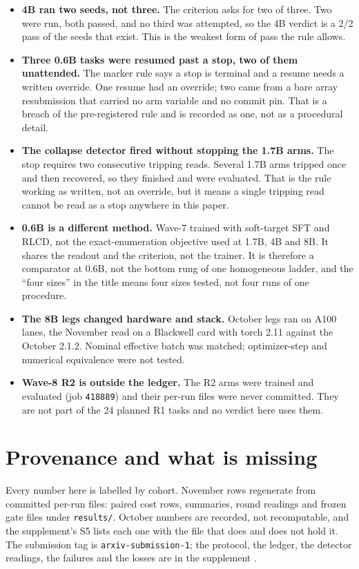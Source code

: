 \documentclass[11pt]{article}
\begin{document}
\begin{itemize}
  \item \textbf{4B ran two seeds, not three.} The criterion asks for two of three. Two were run, both
  passed, and no third was attempted, so the 4B verdict is a 2/2 pass of the seeds that exist. This is
  the weakest form of pass the rule allows.
  \item \textbf{Three 0.6B tasks were resumed past a stop, two of them unattended.} The marker rule says
  a stop is terminal and a resume needs a written override. One resume had an override; two came from a
  bare array resubmission that carried no arm variable and no commit pin. That is a breach of the
  pre-registered rule and is recorded as one, not as a procedural detail.
  \item \textbf{The collapse detector fired without stopping the 1.7B arms.} The stop requires two
  consecutive tripping reads. Several 1.7B arms tripped once and then recovered, so they finished and
  were evaluated. That is the rule working as written, not an override, but it means a single tripping
  read cannot be read as a stop anywhere in this paper.
  \item \textbf{0.6B is a different method.} Wave-7 trained with soft-target SFT and RLCD, not the
  exact-enumeration objective used at 1.7B, 4B and 8B. It shares the readout and the criterion, not the
  trainer. It is therefore a comparator at 0.6B, not the bottom rung of one homogeneous ladder, and the
  ``four sizes'' in the title means four sizes tested, not four runs of one procedure.
  \item \textbf{The 8B legs changed hardware and stack.} October legs ran on A100 lanes, the November
  read on a Blackwell card with torch 2.11 against the October 2.1.2. Nominal effective batch was
  matched; optimizer-step and numerical equivalence were not tested.
  \item \textbf{Wave-8 R2 is outside the ledger.} The R2 arms were trained and evaluated (job
  \texttt{418889}) and their per-run files were never committed. They are not part of the 24 planned
  R1 tasks and no verdict here uses them.
\end{itemize}

\section{Provenance and what is missing}\label{sec:prov}

Every number here is labelled by cohort. November rows regenerate from committed per-run files:
paired cost rows, summaries, round readings and frozen gate files under \texttt{results/}. October
numbers are recorded, not recomputable, and the supplement's S5 lists each one with the file that does
and does not hold it. The submission tag is \texttt{arxiv-submission-1}; the protocol, the ledger, the
detector readings, the failures and the losses are in the supplement \cite{supplement}.
\end{document}
